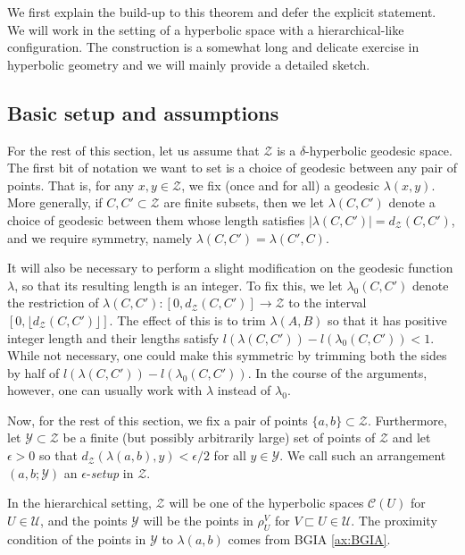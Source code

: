 \documentclass{amsart}
\theoremstyle{definition}
\theoremstyle{remark}
\theoremstyle{definition}
\newcommand{\calC}{\mathcal{C}}
\newcommand{\calU}{\mathcal{U}}
\newcommand{\calY}{\mathcal{Y}}
\newcommand{\calZ}{\mathcal{Z}}
\newcommand{\nest}{\sqsubset}
\begin{document}
We first explain the build-up to this theorem and defer the explicit statement.  We will work in the setting of a hyperbolic space with a hierarchical-like configuration.  The construction is a somewhat long and delicate exercise in hyperbolic geometry and we will mainly provide a detailed sketch.

\subsection{Basic setup and assumptions}\label{subsec:stable setup}

For the rest of this section, let us assume that $\calZ$ is a $\delta$-hyperbolic geodesic space.  The first bit of notation we want to set is a choice of geodesic between any pair of points.  That is, for any $x,y \in \calZ$, we fix (once and for all) a geodesic $\lambda(x,y)$.  More generally, if $C,C' \subset \calZ$ are finite subsets, then we let $\lambda(C,C')$ denote a choice of geodesic between them whose length satisfies $|\lambda(C,C')| = d_{\calZ}(C,C')$, and we require symmetry, namely $\lambda(C,C') = \lambda(C',C)$.

It will also be necessary to perform a slight modification on the geodesic function $\lambda$, so that its resulting length is an integer.  To fix this, we let $\lambda_0(C,C')$ denote the restriction of $\lambda(C,C'):[0, d_{\calZ}(C,C')]\to \calZ$ to the interval $[0, \lfloor{d_{\calZ}(C,C')}\rfloor]$.  The effect of this is to trim $\lambda(A,B)$ so that it has positive integer length and their lengths satisfy $l(\lambda(C,C')) -l(\lambda_0(C,C')) < 1$.  While not necessary, one could make this symmetric by trimming both the sides by half of $l(\lambda(C,C')) -l(\lambda_0(C,C'))$.  In the course of the arguments, however, one can usually work with $\lambda$ instead of $\lambda_0$.

Now, for the rest of this section, we fix a pair of points $\{a,b\} \subset \calZ$.  Furthermore, let $\calY \subset \calZ$ be a finite (but possibly arbitrarily large) set of points of $\calZ$ and let $\epsilon>0$ so that $d_{\calZ}(\lambda(a,b), y) < \epsilon/2$ for all $y \in \calY$.  We call such an arrangement $(a,b;\calY)$ an $\epsilon$-\emph{setup} in $\calZ$.

In the hierarchical setting, $\calZ$ will be one of the hyperbolic spaces $\calC(U)$ for $U \in \calU$, and the points $\calY$ will be the points in $\rho^V_U$ for $V \nest U \in \calU$.  The proximity condition of the points in $\calY$ to $\lambda(a,b)$ comes from BGIA \ref{ax:BGIA}.
\end{document}
